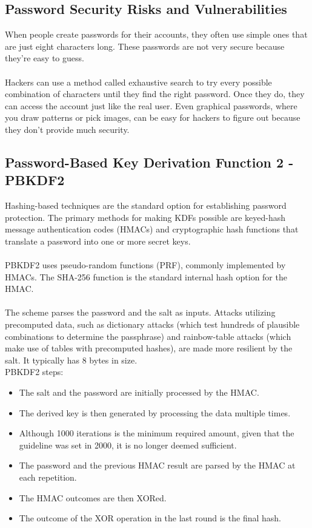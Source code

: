 \documentclass[10pt,oneside,english,a4paper]{article}
\begin{document}
\subsection{Password Security Risks and Vulnerabilities}
When people create passwords for their accounts, they often use simple ones that are just eight characters long. These passwords are not very secure because they're easy to guess. 
\\\\
Hackers can use a method called exhaustive search to try every possible combination of characters until they find the right password. Once they do, they can access the account just like the real user. Even graphical passwords, where you draw patterns or pick images, can be easy for hackers to figure out because they don't provide much security.

\subsection{Password-Based Key Derivation Function 2 - PBKDF2}
Hashing-based techniques are the standard option for establishing password protection. The primary methods for making KDFs possible are keyed-hash message authentication codes (HMACs) and cryptographic hash functions that translate a password into one or more secret keys.
\\\\
PBKDF2 uses pseudo-random functions (PRF), commonly implemented by HMACs.
The SHA-256 function is the standard internal hash option for the HMAC. 
\\\\
The scheme parses the password and the salt as inputs.
Attacks utilizing precomputed data, such as dictionary attacks (which test hundreds of plausible combinations to determine the passphrase) and rainbow-table attacks (which make use of tables with precomputed hashes), are made more resilient by the salt. 
It typically has 8 bytes in size.\\
PBKDF2 steps:

\begin{itemize}
\item The salt and the password are initially processed by the HMAC. 
\item The derived key is then generated by processing the data multiple times.
\item Although 1000 iterations is the minimum required amount, given that the guideline was set in 2000, it is no longer deemed sufficient. 
\item The password and the previous HMAC result are parsed by the HMAC at each repetition.  
\item The HMAC outcomes are then XORed.
\item The outcome of the XOR operation in the last round is the final hash.
\end{itemize}
\end{document}

